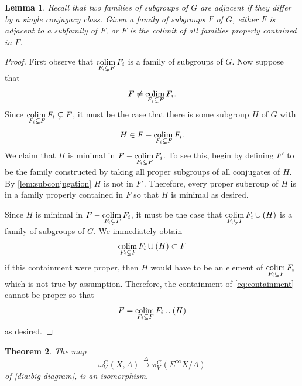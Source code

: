 \documentclass[11pt]{amsart}
\newcommand{\colim}{\textup{colim}\,}
\theoremstyle{plain}   %
\newtheorem{thm}{Theorem}[section] %
\newtheorem{lem}[thm]{Lemma}
\theoremstyle{definition}
\theoremstyle{remark}
\numberwithin{equation}{section}
\begin{document}
\begin{lem}\label{lem:families of subgroups are adjacent or colimits}
Recall that two families of subgroups of $G$ are adjacent if they differ by a single conjugacy class. Given a family of subgroups $F$ of $G$, either $F$ is adjacent to a subfamily of $F$, or $F$ is the colimit of all families properly contained in $F$. 
\end{lem}

\begin{proof}
First observe that $\underset{F_i\subsetneq F}{\colim} F_i$ is a family of subgroups of $G$. Now suppose that 
\[
F\neq \underset{F_i\subsetneq F}{\colim} F_i.
\] 
Since $\underset{F_i\subsetneq F}{\colim} F_i \subsetneq F$, it must be the case that there is some subgroup $H$ of $G$ with
\[
H\in F - \underset{F_i\subsetneq F}{\colim} F_i.
\]
We claim that $H$ is minimal in $F - \underset{F_i\subsetneq F}{\colim} F_i$. To see this, begin by defining $F'$ to be the family constructed by taking all proper subgroups of all conjugates of $H$.  By \cref{lem:subconjugation} $H$ is not in $F'$. Therefore, every proper subgroup of $H$ is in a family properly contained in $F$ so that $H$ is minimal as desired.

Since $H$ is minimal in $F-\underset{F_i\subsetneq F}{\colim} F_i$, it must be the case that $\underset{F_i\subsetneq F}{\colim} F_i\cup (H)$ is a family of subgroups of $G$. We immediately obtain 
\begin{equation}\label{eq:containment}
\underset{F_i\subsetneq F}{\colim} F_i\cup (H)\subset F
\end{equation}
if this containment were proper, then $H$ would have to be an element of $\underset{F_i\subsetneq F}{\colim} F_i$ which is not true by assumption. Therefore, the containment of \cref{eq:containment} cannot be proper so that 
\[
F = \underset{F_i\subsetneq F}{\colim} F_i\cup (H)
\] 
as desired. 
\end{proof}

\begin{thm}\label{thm:equivariant framed PT}
The map 
\[
\omega_V^G(X,A) \xrightarrow{\Delta} \pi_V^G(\Sigma^\infty X/A)
\]
of \cref{dia:big diagram}, is an isomorphism.
\end{thm}
\end{document}
